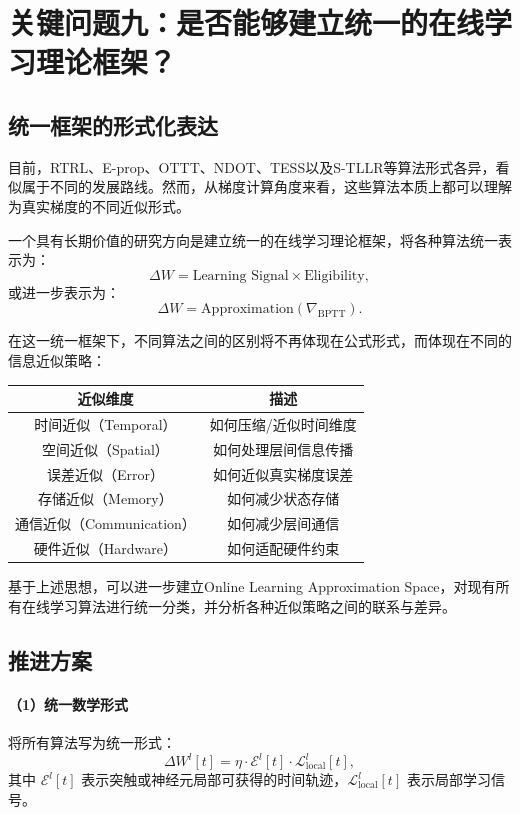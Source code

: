 \documentclass[journal,12pt,onecolumn]{IEEEtran}
\begin{document}
\section{关键问题九：是否能够建立统一的在线学习理论框架？}

\subsection{统一框架的形式化表达}

目前，RTRL、E-prop、OTTT、NDOT、TESS以及S-TLLR等算法形式各异，看似属于不同的发展路线。然而，从梯度计算角度来看，这些算法本质上都可以理解为真实梯度的不同近似形式。

一个具有长期价值的研究方向是建立统一的在线学习理论框架，将各种算法统一表示为：
\[
\Delta W = \text{Learning Signal} \times \text{Eligibility},
\]
或进一步表示为：
\[
\Delta W = \mathrm{Approximation}(\nabla_{\mathrm{BPTT}}).
\]

在这一统一框架下，不同算法之间的区别将不再体现在公式形式，而体现在不同的信息近似策略：

\begin{center}
\begin{tabular}{c|c}
\hline
近似维度 & 描述 \\
\hline
时间近似（Temporal） & 如何压缩/近似时间维度 \\
空间近似（Spatial） & 如何处理层间信息传播 \\
误差近似（Error） & 如何近似真实梯度误差 \\
存储近似（Memory） & 如何减少状态存储 \\
通信近似（Communication） & 如何减少层间通信 \\
硬件近似（Hardware） & 如何适配硬件约束 \\
\hline
\end{tabular}
\end{center}

基于上述思想，可以进一步建立Online Learning Approximation Space，对现有所有在线学习算法进行统一分类，并分析各种近似策略之间的联系与差异。

\subsection{推进方案}

\paragraph{（1）统一数学形式}
将所有算法写为统一形式：
\[
\Delta W^l[t] = \eta \cdot \mathcal{E}^l[t] \cdot \mathcal{L}^l_{\text{local}}[t],
\]
其中 \(\mathcal{E}^l[t]\) 表示突触或神经元局部可获得的时间轨迹，\(\mathcal{L}^l_{\text{local}}[t]\) 表示局部学习信号。
\end{document}
